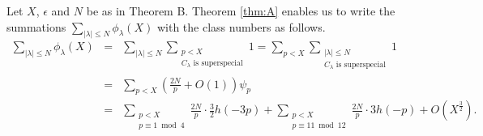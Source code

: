 \documentclass[a4paper, 11pt]{article}
\theoremstyle{plain}
\newcommand{\?}{\textcolor{red}{??}}
\newcommand{\lm}{\lambda}
\begin{document}
Let $X$, $\epsilon$ and $N$ be as in Theorem B. Theorem \ref{thm:A} enables us to write the summations $\sum_{|\lm| \le N} {\phi}_{\lm}(X)$ with the class numbers as follows. 
\begin{eqnarray}
    \sum_{|\lm| \le N} {\phi}_{\lm}(X) &=&  \sum_{|\lm| \le N} \sum_{\substack{p < X \\  C_{\lm} \text{ is superspecial} }} 1 
= \sum_{p < X} \sum_{\substack{|\lm| \le N \\ C_{\lm} \text{ is superspecial} }} 1 \nonumber\\
&=& \sum_{p < X}   \left( \frac{2N}{p} +O(1)  \right) {\psi}_{p} \nonumber\\
 &=& \!\!\! \sum_{\substack{p<X \\ p \equiv 1 \bmod 4}} \frac{2N}{p} \cdot \frac{3}{2} h(-3p) + \!\!\!  \sum_{\substack{p<X \\ p  \equiv 11 \bmod 12}} \frac{2N}{p}\cdot 3 h(-p)  +  O \left( X^{\frac{3}{2}} \right) .\nonumber\\&&\label{anaeq1}
\end{eqnarray}
\end{document}
